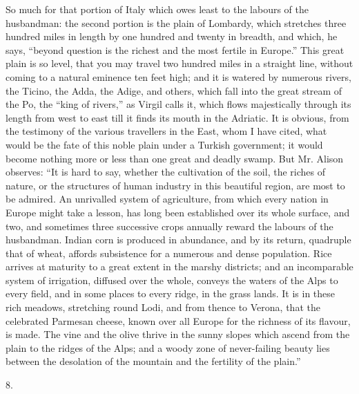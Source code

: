 So much for that portion of
Italy which owes least to the labours of the husbandman: the second
portion is the plain of Lombardy, which stretches three hundred miles
in length by one hundred and twenty in breadth, and which, he says, ``beyond
question is the richest and the most fertile in Europe.'' This great
plain is so level, that you may travel two hundred miles in a straight
line, without coming to a natural eminence ten feet high; and it is
watered by numerous rivers, the Ticino, the Adda, the Adige, and
others, which fall into the great stream of the Po, the ``king of
rivers,'' as Virgil calls it, which flows majestically through its
length from west to east till it finds its mouth in the Adriatic. It
is obvious, from the testimony of the various travellers in the East,
whom I have cited, what would be the fate of this noble plain under a
Turkish government; it would become nothing more or less than one
great and deadly swamp. But Mr. Alison observes: ``It is hard to say,
whether the cultivation of the soil, the riches of nature, or the
structures of human industry in this beautiful region, are most to be
admired. An unrivalled system of agriculture, from which every nation
in Europe might take a lesson, has long been established over its
whole surface, and two, and sometimes three successive crops annually reward the labours of the husbandman. Indian corn is produced
in abundance, and by its return, quadruple that of wheat, affords
subsistence for a numerous and dense population. Rice arrives at
maturity to a great extent in the marshy districts; and an
incomparable system of irrigation, diffused over the whole, conveys
the waters of the Alps to every field, and in some places to every
ridge, in the grass lands. It is in these rich meadows, stretching
round Lodi, and from thence to Verona, that the celebrated Parmesan
cheese, known over all Europe for the richness of its flavour, is
made. The vine and the olive thrive in the sunny slopes which ascend
from the plain to the ridges of the Alps; and a woody zone of
never-failing beauty lies between the desolation of the mountain and
the fertility of the plain.''

8.

